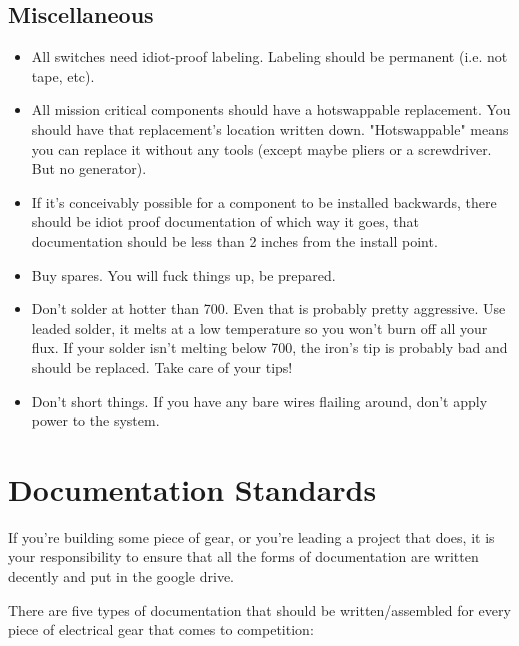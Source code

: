 \documentclass{article}
\begin{document}
\subsection{Miscellaneous}
\begin{itemize}
\item All switches need idiot-proof labeling. Labeling should be permanent (i.e. not tape, etc).
\item All mission critical components should have a hotswappable replacement. You should have that replacement's location written down. "Hotswappable" means you can replace it without any tools (except maybe pliers or a screwdriver. But no generator).
\item If it's conceivably possible for a component to be installed backwards, there should be idiot proof documentation of which way it goes, that documentation should be less than 2 inches from the install point.
\item Buy spares. You will fuck things up, be prepared.
\item Don't solder at hotter than 700\degree. Even that is probably pretty aggressive. Use leaded solder, it melts at a low temperature so you won't burn off all your flux. If your solder isn't melting below 700\degree, the iron's tip is probably bad and should be replaced. Take care of your tips!
\item Don't short things. If you have any bare wires flailing around, don't apply power to the system.
\end{itemize}

\section{Documentation Standards}
If you're building some piece of gear, or you're leading a project that does, it is your responsibility to ensure that all the forms of documentation are written decently and put in the google drive.

There are five types of documentation that should be written/assembled for every piece of electrical gear that comes to competition:
\end{document}
